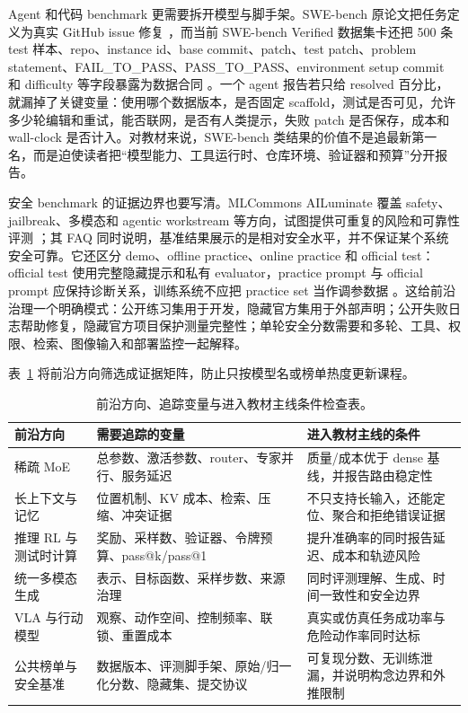 \documentclass[UTF8,zihao=-4,openany]{ctexbook}
\begin{document}
Agent 和代码 benchmark 更需要拆开模型与脚手架。SWE-bench 原论文把任务定义为真实 GitHub issue 修复 \cite{jimenez2023swebench}，而当前 SWE-bench Verified 数据集卡还把 500 条 test 样本、repo、instance id、base commit、patch、test patch、problem statement、FAIL\_TO\_PASS、PASS\_TO\_PASS、environment setup commit 和 difficulty 等字段暴露为数据合同 \cite{swebench2026verifieddataset}。一个 agent 报告若只给 resolved 百分比，就漏掉了关键变量：使用哪个数据版本，是否固定 scaffold，测试是否可见，允许多少轮编辑和重试，能否联网，是否有人类提示，失败 patch 是否保存，成本和 wall-clock 是否计入。对教材来说，SWE-bench 类结果的价值不是追最新第一名，而是迫使读者把“模型能力、工具运行时、仓库环境、验证器和预算”分开报告。

安全 benchmark 的证据边界也要写清。MLCommons AILuminate 覆盖 safety、jailbreak、多模态和 agentic workstream 等方向，试图提供可重复的风险和可靠性评测 \cite{mlcommons2026ailuminate}；其 FAQ 同时说明，基准结果展示的是相对安全水平，并不保证某个系统安全可靠。它还区分 demo、offline practice、online practice 和 official test：official test 使用完整隐藏提示和私有 evaluator，practice prompt 与 official prompt 应保持诊断关系，训练系统不应把 practice set 当作调参数据 \cite{mlcommons2026ailuminatefaq}。这给前沿治理一个明确模式：公开练习集用于开发，隐藏官方集用于外部声明；公开失败日志帮助修复，隐藏官方项目保护测量完整性；单轮安全分数需要和多轮、工具、权限、检索、图像输入和部署监控一起解释。

表~\ref{tab:zh-frontier-evidence-screen} 将前沿方向筛选成证据矩阵，防止只按模型名或榜单热度更新课程。

\begin{table}[t]
\centering
\begin{tabular}{p{}p{}p{}}
\toprule
前沿方向 & 需要追踪的变量 & 进入教材主线的条件 \\
\midrule
稀疏 MoE & 总参数、激活参数、router、专家并行、服务延迟 & 质量/成本优于 dense 基线，并报告路由稳定性 \\
长上下文与记忆 & 位置机制、KV 成本、检索、压缩、冲突证据 & 不只支持长输入，还能定位、聚合和拒绝错误证据 \\
推理 RL 与测试时计算 & 奖励、采样数、验证器、令牌预算、pass@k/pass@1 & 提升准确率的同时报告延迟、成本和轨迹风险 \\
统一多模态生成 & 表示、目标函数、采样步数、来源治理 & 同时评测理解、生成、时间一致性和安全边界 \\
VLA 与行动模型 & 观察、动作空间、控制频率、联锁、重置成本 & 真实或仿真任务成功率与危险动作率同时达标 \\
公共榜单与安全基准 & 数据版本、评测脚手架、原始/归一化分数、隐藏集、提交协议 & 可复现分数、无训练泄漏，并说明构念边界和外推限制 \\
\bottomrule
\end{tabular}
\caption{前沿方向、追踪变量与进入教材主线条件检查表。}
\label{tab:zh-frontier-evidence-screen}
\end{table}
\end{document}
